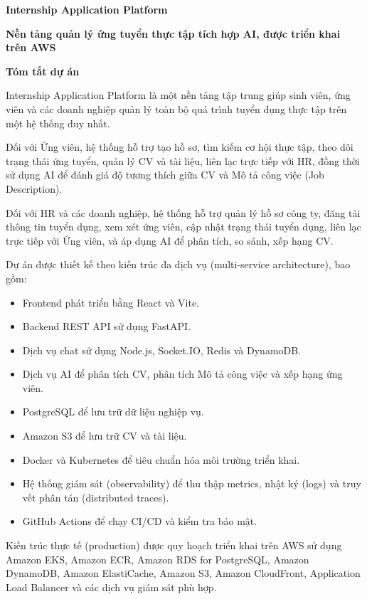 \vspace{0.5em}\noindent\textbf{Internship Application
Platform}\par

\textbf{Nền tảng quản lý ứng tuyển thực tập tích hợp AI, được triển khai
trên AWS}

\vspace{0.5em}\noindent\textbf{Tóm tắt dự án}\par

Internship Application Platform là một nền tảng tập trung giúp sinh
viên, ứng viên và các doanh nghiệp quản lý toàn bộ quá trình tuyển dụng
thực tập trên một hệ thống duy nhất.

Đối với Ứng viên, hệ thống hỗ trợ tạo hồ sơ, tìm kiếm cơ hội thực tập,
theo dõi trạng thái ứng tuyển, quản lý CV và tài liệu, liên lạc trực
tiếp với HR, đồng thời sử dụng AI để đánh giá độ tương thích giữa CV và
Mô tả công việc (Job Description).

Đối với HR và các doanh nghiệp, hệ thống hỗ trợ quản lý hồ sơ công ty,
đăng tải thông tin tuyển dụng, xem xét ứng viên, cập nhật trạng thái
tuyển dụng, liên lạc trực tiếp với Ứng viên, và áp dụng AI để phân tích,
so sánh, xếp hạng CV.

Dự án được thiết kế theo kiến trúc đa dịch vụ (multi-service
architecture), bao gồm:

\begin{itemize}
\tightlist
\item
  Frontend phát triển bằng React và Vite.
\item
  Backend REST API sử dụng FastAPI.
\item
  Dịch vụ chat sử dụng Node.js, Socket.IO, Redis và DynamoDB.
\item
  Dịch vụ AI để phân tích CV, phân tích Mô tả công việc và xếp hạng ứng
  viên.
\item
  PostgreSQL để lưu trữ dữ liệu nghiệp vụ.
\item
  Amazon S3 để lưu trữ CV và tài liệu.
\item
  Docker và Kubernetes để tiêu chuẩn hóa môi trường triển khai.
\item
  Hệ thống giám sát (observability) để thu thập metrics, nhật ký (logs)
  và truy vết phân tán (distributed traces).
\item
  GitHub Actions để chạy CI/CD và kiểm tra bảo mật.
\end{itemize}

Kiến trúc thực tế (production) được quy hoạch triển khai trên AWS sử
dụng Amazon EKS, Amazon ECR, Amazon RDS for PostgreSQL, Amazon DynamoDB,
Amazon ElastiCache, Amazon S3, Amazon CloudFront, Application Load
Balancer và các dịch vụ giám sát phù hợp.

